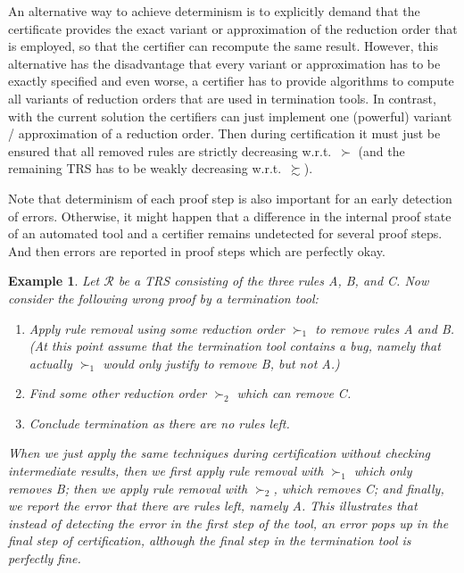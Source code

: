 \documentclass[USenglish]{eptcs}
\newcommand\RR{\ensuremath{\mathcal{R}}\xspace}
\newtheorem{example}{Example}
\begin{document}
An alternative way to achieve determinism is to explicitly demand that the
certificate provides the exact variant or approximation of the reduction order
that is employed, so that the certifier can recompute the same result.
However, this
alternative has the disadvantage that every variant or approximation has to
be exactly specified and even worse, a certifier has to provide algorithms
to compute all variants of reduction orders that are used in termination tools. 
In contrast, with the current solution the certifiers can just implement one
(powerful) variant / approximation of a reduction order. Then during certification
it must just be ensured that all removed rules are strictly decreasing w.r.t.\ $\succ$ (and
the remaining TRS has to be weakly decreasing w.r.t.\ $\succsim$). 

Note that determinism of each proof step is also important for an early detection
of errors. Otherwise, it might happen that a difference in the internal proof 
state of an automated tool and a certifier remains 
undetected for several proof steps. And then errors are reported in proof steps 
which are perfectly okay.

\begin{example}
Let $\RR$ be a TRS consisting of the three rules A, B, and C.
Now consider the following wrong proof by a termination tool:
\begin{enumerate}
\item
Apply rule removal using some reduction order $\succ_1$ to remove rules A and B.
(At this point assume that the termination tool contains a bug, namely that
actually $\succ_1$ would only justify to remove B, but not A.)

\item
Find some other reduction order $\succ_2$ which can remove C.
\item
Conclude termination as there are no rules left.
\end{enumerate}

When we just apply the same techniques during certification without checking
intermediate results, then we first apply rule removal with $\succ_1$ which only
removes B; then we apply rule removal with $\succ_2$, which removes C; and
finally, we report the error that there are rules left, namely A.  This
illustrates that instead of detecting the error in the first step of the tool,
an error pops up in the final step of certification, although the final step in
the termination tool is perfectly fine.
\end{example}
\end{document}
